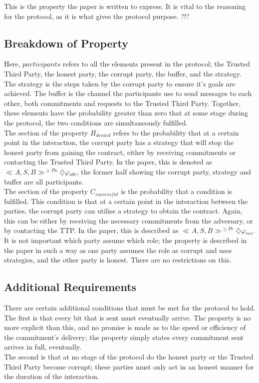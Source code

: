 \documentclass{l4proj}
\begin{document}
This is the property the paper is written to express. It is vital to the reasoning for the protocol, as it is what gives the protocol purpose. ?!?
\subsection{Breakdown of Property}
Here, $participants$ refers to all the elements present in the protocol; the Trusted Third Party, the honest party, the corrupt party, the buffer, and the strategy. The strategy is the steps taken by the corrupt party to ensure it's goals are achieved. The buffer is the channel the participants use to send messages to each other, both commitments and requests to the Trusted Third Party. Together, these elements have the probability greater than zero that at some stage during the protocol, the two conditions are simultaneously fulfilled.\\
The section of the property $H_{denied}$ refers to the probability that at a certain point in the interaction, the corrupt party has a strategy that will stop the honest party from gaining the contract, either by receiving commitments or contacting the Trusted Third Party. In the paper, this is denoted as  $\ll A, S, B \gg^{\ge Pa} \diamondsuit \varphi{_{abr}}$, the former half showing the corrupt party, strategy and buffer are all participants. \\
The section of the property $C_{successful}$ is the probability that a condition is fulfilled. This condition is that at a certain point in the interaction between the parties, the corrupt party can utilise a strategy to obtain the contract. Again, this can be either by receiving the necessary commitments from the adversary, or by contacting the TTP. In the paper, this is described as $\ll A, S, B \gg^{\ge Pr} \diamondsuit \varphi{_{res}}$. \\
It is not important which party assume which role; the property is described in the paper in such a way as one party assumes the role as corrupt and uses strategies, and the other party is honest. There are no restrictions on this.
\subsection{Additional Requirements}
There are certain additional conditions that must be met for the protocol to hold. The first is that every bit that is sent must eventually arrive. The property is no more explicit than this, and no promise is made as to the speed or efficiency of the commitment's delivery; the property simply states every commitment sent arrives in full, eventually.\\
The second is that at no stage of the protocol do the honest party or the Trusted Third Party become corrupt; these parties must only act in an honest manner for the duration of the interaction.
\end{document}
